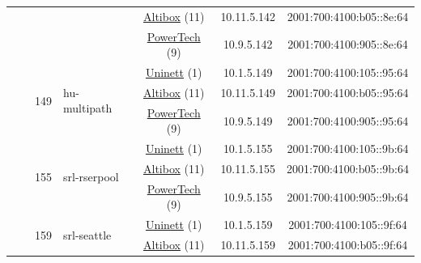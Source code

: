 \begin{small}
\begin{center}
\begin{longtable}{|c|c|c|c|c|c|c|c|}
  &  &  &  & \multicolumn{2}{|c|}{\tiny{\href{https://www.altibox.no}{Altibox} (11)}} & \tiny{10.11.5.142} & \tiny{2001:700:4100:b05::8e:64} \\* \cline{5-5}\cline{6-6}\cline{7-7}\cline{8-8}
  &  &  &  & \multicolumn{2}{|c|}{\tiny{\href{http://www.powertech.no}{PowerTech} (9)}} & \tiny{10.9.5.142} & \tiny{2001:700:4100:905::8e:64} \\* \cline{3-3}\cline{4-4}\cline{5-5}\cline{6-6}\cline{7-7}\cline{8-8}
  &  & \multirow{3}{*}{\tiny{149}} & \multicolumn{1}{|l|}{\multirow{3}{*}{\tiny{hu-multipath}}} & \multicolumn{2}{|c|}{\tiny{\href{https://www.uninett.no}{Uninett} (1)}} & \tiny{10.1.5.149} & \tiny{2001:700:4100:105::95:64} \\* \cline{5-5}\cline{6-6}\cline{7-7}\cline{8-8}
  &  &  &  & \multicolumn{2}{|c|}{\tiny{\href{https://www.altibox.no}{Altibox} (11)}} & \tiny{10.11.5.149} & \tiny{2001:700:4100:b05::95:64} \\* \cline{5-5}\cline{6-6}\cline{7-7}\cline{8-8}
  &  &  &  & \multicolumn{2}{|c|}{\tiny{\href{http://www.powertech.no}{PowerTech} (9)}} & \tiny{10.9.5.149} & \tiny{2001:700:4100:905::95:64} \\* \cline{3-3}\cline{4-4}\cline{5-5}\cline{6-6}\cline{7-7}\cline{8-8}
  &  & \multirow{3}{*}{\tiny{155}} & \multicolumn{1}{|l|}{\multirow{3}{*}{\tiny{srl-rserpool}}} & \multicolumn{2}{|c|}{\tiny{\href{https://www.uninett.no}{Uninett} (1)}} & \tiny{10.1.5.155} & \tiny{2001:700:4100:105::9b:64} \\* \cline{5-5}\cline{6-6}\cline{7-7}\cline{8-8}
  &  &  &  & \multicolumn{2}{|c|}{\tiny{\href{https://www.altibox.no}{Altibox} (11)}} & \tiny{10.11.5.155} & \tiny{2001:700:4100:b05::9b:64} \\* \cline{5-5}\cline{6-6}\cline{7-7}\cline{8-8}
  &  &  &  & \multicolumn{2}{|c|}{\tiny{\href{http://www.powertech.no}{PowerTech} (9)}} & \tiny{10.9.5.155} & \tiny{2001:700:4100:905::9b:64} \\* \cline{3-3}\cline{4-4}\cline{5-5}\cline{6-6}\cline{7-7}\cline{8-8}
  &  & \multirow{3}{*}{\tiny{159}} & \multicolumn{1}{|l|}{\multirow{3}{*}{\tiny{srl-seattle}}} & \multicolumn{2}{|c|}{\tiny{\href{https://www.uninett.no}{Uninett} (1)}} & \tiny{10.1.5.159} & \tiny{2001:700:4100:105::9f:64} \\* \cline{5-5}\cline{6-6}\cline{7-7}\cline{8-8}
  &  &  &  & \multicolumn{2}{|c|}{\tiny{\href{https://www.altibox.no}{Altibox} (11)}} & \tiny{10.11.5.159} & \tiny{2001:700:4100:b05::9f:64} \\* \cline{5-5}\cline{6-6}\cline{7-7}\cline{8-8}

\end{longtable}
\end{center}
\end{small}
